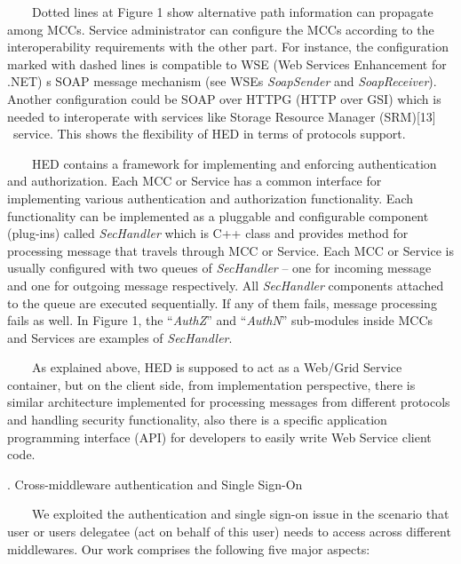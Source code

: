 \documentclass{article}
\begin{document}
\ \ \ \ Dotted lines at Figure 1 show alternative path information can
propagate among MCCs. Service administrator can configure the MCCs
according to the interoperability requirements with the other part. For
instance, the configuration marked with dashed lines is compatible to
WSE (Web Services Enhancement for .NET) {\textquotesingle}s SOAP
message mechanism (see WSE{\textquotesingle}s \textit{SoapSender} and
\textit{SoapReceiver}). Another configuration could be SOAP over HTTPG
(HTTP over GSI) which is needed to interoperate with services like
Storage Resource Manager (SRM)[13] \ service. This shows the
flexibility of HED in terms of protocols support.

\ \ \ \ HED contains a framework for implementing and enforcing
authentication and authorization. Each MCC or Service has a common
interface for implementing various authentication and authorization
functionality. Each functionality can be implemented as a pluggable and
configurable component (plug-ins) called \textit{SecHandler} which is
C++ class and provides method for processing message that travels
through MCC or Service. Each MCC or Service is usually configured with
two queues of \textit{SecHandler} -- one for incoming message and one
for outgoing message respectively. All \textit{SecHandler} components
attached to the queue are executed sequentially. If any of them fails,
message processing fails as well. In Figure 1, the
{\textquotedblleft}\textit{AuthZ}{\textquotedblright} and
{\textquotedblleft}\textit{AuthN}{\textquotedblright} sub-modules
inside MCCs and Services are examples of \textit{SecHandler}.

\ \ \ \ As explained above, HED is supposed to act as a Web/Grid Service
container, but on the client side, from implementation perspective,
there is similar architecture implemented for processing messages from
different protocols and handling security functionality, also there is
a specific application programming interface (API) for developers to
easily write Web Service client code.


\bigskip

{. Cross-middleware authentication and Single Sign-On
\par}

\ \ \ \ We exploited the authentication and single sign-on issue in the
scenario that user or user{\textquotesingle}s delegatee (act on behalf
of this user) needs to access across different middlewares. Our work
comprises the following five major aspects:
\end{document}
